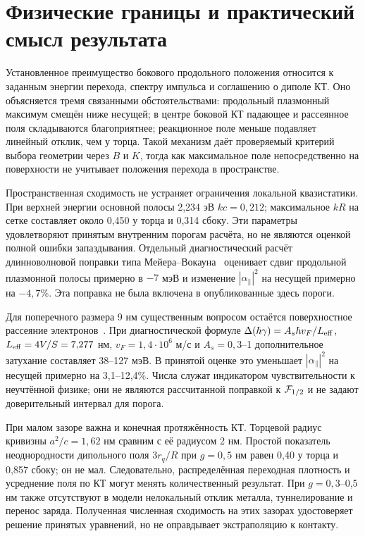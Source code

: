 \FloatBarrier
\section{Физические границы и практический смысл результата}
Установленное преимущество бокового продольного положения относится
к заданным энергии перехода, спектру импульса и соглашению о диполе КТ.
Оно объясняется тремя связанными обстоятельствами: продольный
плазмонный максимум смещён ниже несущей; в центре боковой КТ
падающее и рассеянное поля складываются благоприятнее; реакционное
поле меньше подавляет линейный отклик, чем у торца.
Такой механизм даёт проверяемый критерий выбора геометрии через
$B$ и $K$, тогда как максимальное поле непосредственно на поверхности
не учитывает положения перехода в пространстве.

Пространственная сходимость не устраняет ограничения локальной
квазистатики. При верхней энергии основной полосы 2,234 эВ
$kc=0{,}212$; максимальное $kR$ на сетке составляет около
0,450 у торца и 0,314 сбоку. Эти параметры удовлетворяют
принятым внутренним порогам расчёта, но не являются оценкой полной
ошибки запаздывания. Отдельный диагностический расчёт длинноволновой
поправки типа Мейера--Вокауна~\cite{meier1983} оценивает сдвиг
продольной плазмонной полосы примерно в $-7$ мэВ и изменение
$|\alpha_\parallel|^2$ на несущей примерно на $-4{,}7$\%.
Эта поправка не была включена в опубликованные здесь пороги.

Для поперечного размера 9 нм существенным вопросом остаётся
поверхностное рассеяние электронов~\cite{novo2006}.
При диагностической формуле
$\Delta(\hbar\gamma)=A_s\hbar v_F/L_{\rm eff}$,
$L_{\rm eff}=4V/S=7{,}277$ нм, $v_F=1{,}4\cdot10^6$ м/с
и $A_s=0{,}3$--1 дополнительное затухание составляет
38--127 мэВ. В принятой оценке это уменьшает
$|\alpha_\parallel|^2$ на несущей примерно на 3,1--12,4\%.
Числа служат индикатором чувствительности к неучтённой физике;
они не являются рассчитанной поправкой к $\mathcal F_{1/2}$ и не задают
доверительный интервал для порога.

При малом зазоре важна и конечная протяжённость КТ.
Торцевой радиус кривизны $a^2/c=1{,}62$ нм сравним с её радиусом
2 нм. Простой показатель неоднородности дипольного поля
$3r_q/R$ при $g=0{,}5$ нм равен 0,40 у торца и 0,857 сбоку;
он не мал. Следовательно, распределённая переходная плотность
и усреднение поля по КТ могут менять количественный результат.
При $g=0{,}3$--0,5 нм также отсутствуют в модели нелокальный
отклик металла, туннелирование и перенос заряда.
Полученная численная сходимость на этих зазорах удостоверяет решение
принятых уравнений, но не оправдывает экстраполяцию к контакту.

